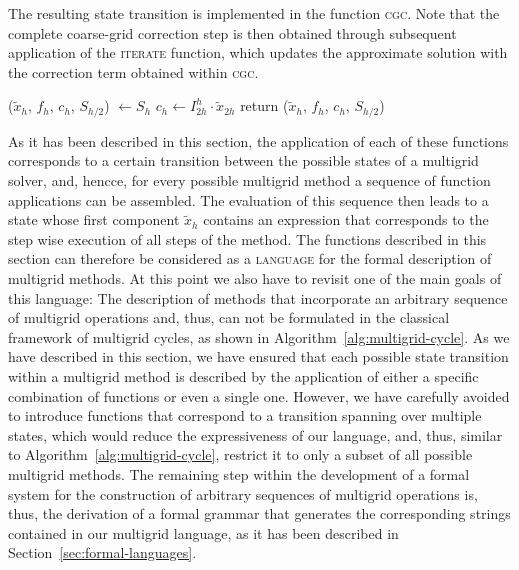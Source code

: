 The resulting state transition is implemented in the function \textsc{cgc}.
Note that the complete coarse-grid correction step is then obtained through subsequent application of the \textsc{iterate} function, which updates the approximate solution with the correction term obtained within \textsc{cgc}.
\begin{algorithm}
	\begin{algorithmic}
		\State ($\tilde{x}_h$, $f_{h}$, $c_h$, $S_{h/2}$) $\gets S_{h}$
		\State $c_h \gets I_{2h}^{h} \cdot \tilde{x}_{2h}$
		\State return ($\tilde{x}_h$, $f_{h}$, $c_h$, $S_{h/2}$)
		\EndFunction
	\end{algorithmic}
\end{algorithm}
As it has been described in this section, the application of each of these functions corresponds to a certain transition between the possible states of a multigrid solver, and, hencce, for every possible multigrid method a sequence of function applications can be assembled.
The evaluation of this sequence then leads to a state whose first component $\tilde{x}_h$ contains an expression that corresponds to the step wise execution of all steps of the method.
The functions described in this section can therefore be considered as a \textsc{language} for the formal description of multigrid methods.
At this point we also have to revisit one of the main goals of this language: The description of methods that incorporate an arbitrary sequence of multigrid operations and, thus, can not be formulated in the classical framework of multigrid cycles, as shown in Algorithm~\ref{alg:multigrid-cycle}.
As we have described in this section, we have ensured that each possible state transition within a multigrid method is described by the application of either a specific combination of functions or even a single one.
However, we have carefully avoided to introduce functions that correspond to a transition spanning over multiple states, which would reduce the expressiveness of our language, and, thus, similar to Algorithm~\ref{alg:multigrid-cycle}, restrict it to only a subset of all possible multigrid methods.
The remaining step within the development of a formal system for the construction of arbitrary sequences of multigrid operations is, thus, the derivation of a formal grammar that generates the corresponding strings contained in our multigrid language, as it has been described in Section~\ref{sec:formal-languages}.
